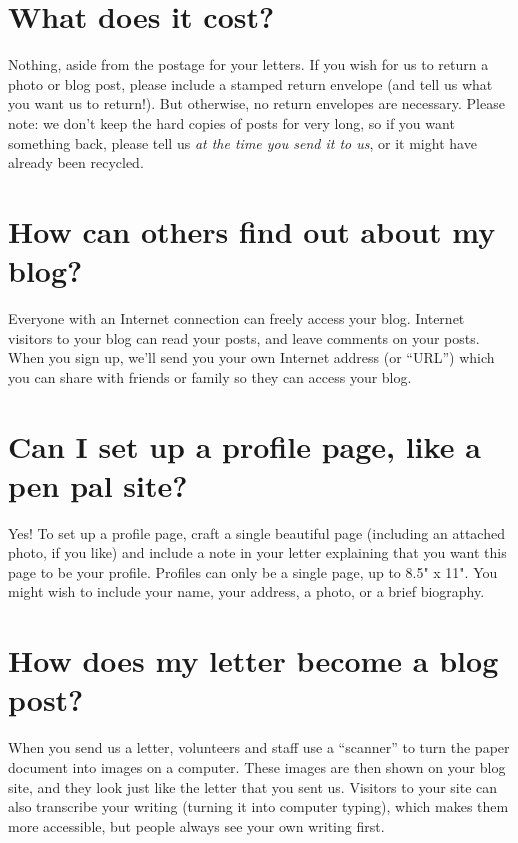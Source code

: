 \documentclass[12pt]{article}
\begin{document}
{{\section*{What does it cost?}
Nothing, aside from the postage for your letters.  If you wish for us to return a photo or blog post, please include a stamped return envelope (and tell us what you want us to return!).  But otherwise, no return envelopes are necessary.  Please note: we don't keep the hard copies of posts for very long, so if you want something back, please tell us \emph{at the time you send it to us}, or it might have already been recycled.

\section*{How can others find out about my blog?}
Everyone with an Internet connection can freely access your blog.  Internet visitors to your blog can read your posts, and leave comments on your posts.  When you sign up, we'll send you your own Internet address (or ``URL'') which you can share with friends or family so they can access your blog.

\begin{wrapfigure}[5]{R}{1.5in}
\vspace{-30pt}
\texttt{[image: \% templatetag openbrace \%]}{{MEDIA_ROOT}}/intro/profile}
\vspace{-40pt}
\end{wrapfigure}

\section*{Can I set up a profile page, like a pen pal site?}
Yes! To set up a profile page, craft a single beautiful page (including an attached photo, if you like) and include a note in your letter explaining that you want this page to be your profile.  Profiles can only be a single page, up to 8.5" x 11".  You might wish to include your name, your address, a photo, or a brief biography.

\section*{How does my letter become a blog post?}
\begin{wrapfigure}{L}{1.5in}
\vspace{-20pt}
\texttt{[image: \% templatetag openbrace \%]}{{MEDIA_ROOT}}/intro/scanning}
\vspace{-50pt}
\end{wrapfigure}
When you send us a letter, volunteers and staff use a ``scanner'' to turn the paper document into images on a computer.  These images are then shown on your blog site, and they look just like the letter that you sent us.  Visitors to your site can also transcribe your writing (turning it into computer typing), which makes them more accessible, but people always see your own writing first.

}}
\end{document}

